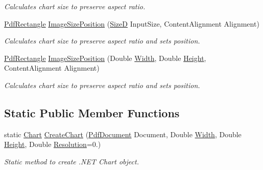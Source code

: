 \begin{DoxyCompactItemize}
\begin{DoxyCompactList}\small\item\em Calculates chart size to preserve aspect ratio. \end{DoxyCompactList}\item 
\hyperlink{class_pdf_file_writer_1_1_pdf_rectangle}{Pdf\+Rectangle} \hyperlink{class_pdf_file_writer_1_1_pdf_chart_ac40c53d40c4dd96ed14ab439102b5dc8}{Image\+Size\+Position} (\hyperlink{class_pdf_file_writer_1_1_size_d}{SizeD} Input\+Size, Content\+Alignment Alignment)
\begin{DoxyCompactList}\small\item\em Calculates chart size to preserve aspect ratio and sets position. \end{DoxyCompactList}\item 
\hyperlink{class_pdf_file_writer_1_1_pdf_rectangle}{Pdf\+Rectangle} \hyperlink{class_pdf_file_writer_1_1_pdf_chart_aab91db8a44792301d6ae76d906df4076}{Image\+Size\+Position} (Double \hyperlink{class_pdf_file_writer_1_1_pdf_chart_a2bbac5f243d2593a15a68c17283765de}{Width}, Double \hyperlink{class_pdf_file_writer_1_1_pdf_chart_a4216487a4cf01f891007685a128bd328}{Height}, Content\+Alignment Alignment)
\begin{DoxyCompactList}\small\item\em Calculates chart size to preserve aspect ratio and sets position. \end{DoxyCompactList}\end{DoxyCompactItemize}
\subsection*{Static Public Member Functions}
\begin{DoxyCompactItemize}
\item 
static \hyperlink{class_pdf_file_writer_1_1_pdf_chart_aa08931d631c7d005f289c4960423a305}{Chart} \hyperlink{class_pdf_file_writer_1_1_pdf_chart_a2dc2a57aa19ff53fbe21889e82e64d2f}{Create\+Chart} (\hyperlink{class_pdf_file_writer_1_1_pdf_document}{Pdf\+Document} Document, Double \hyperlink{class_pdf_file_writer_1_1_pdf_chart_a2bbac5f243d2593a15a68c17283765de}{Width}, Double \hyperlink{class_pdf_file_writer_1_1_pdf_chart_a4216487a4cf01f891007685a128bd328}{Height}, Double \hyperlink{class_pdf_file_writer_1_1_pdf_chart_aa948dfd08bf85fb6d1e5d1376d18d922}{Resolution}=0.)
\begin{DoxyCompactList}\small\item\em Static method to create .N\+ET Chart object. \end{DoxyCompactList}\end{DoxyCompactItemize}
